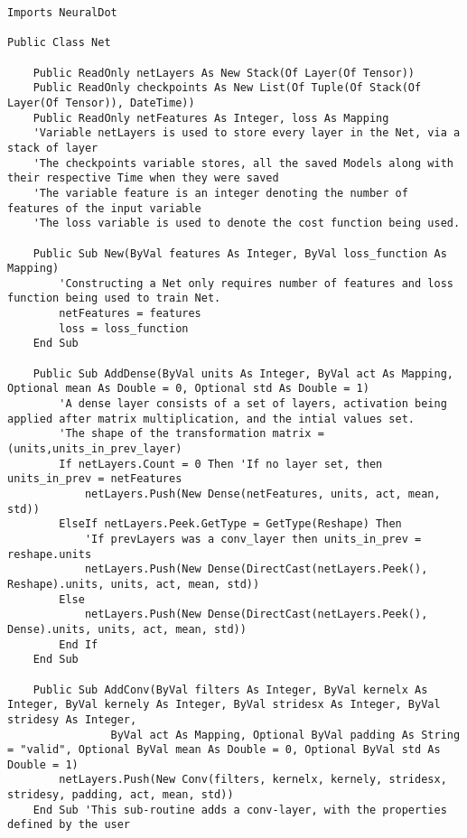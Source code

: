 \begin{verbatim}
Imports NeuralDot

Public Class Net

    Public ReadOnly netLayers As New Stack(Of Layer(Of Tensor))
    Public ReadOnly checkpoints As New List(Of Tuple(Of Stack(Of Layer(Of Tensor)), DateTime))
    Public ReadOnly netFeatures As Integer, loss As Mapping
    'Variable netLayers is used to store every layer in the Net, via a stack of layer
    'The checkpoints variable stores, all the saved Models along with their respective Time when they were saved
    'The variable feature is an integer denoting the number of features of the input variable
    'The loss variable is used to denote the cost function being used.

    Public Sub New(ByVal features As Integer, ByVal loss_function As Mapping)
        'Constructing a Net only requires number of features and loss function being used to train Net.
        netFeatures = features
        loss = loss_function
    End Sub

    Public Sub AddDense(ByVal units As Integer, ByVal act As Mapping, Optional mean As Double = 0, Optional std As Double = 1)
        'A dense layer consists of a set of layers, activation being applied after matrix multiplication, and the intial values set.
        'The shape of the transformation matrix = (units,units_in_prev_layer) 
        If netLayers.Count = 0 Then 'If no layer set, then units_in_prev = netFeatures
            netLayers.Push(New Dense(netFeatures, units, act, mean, std))
        ElseIf netLayers.Peek.GetType = GetType(Reshape) Then
            'If prevLayers was a conv_layer then units_in_prev = reshape.units
            netLayers.Push(New Dense(DirectCast(netLayers.Peek(), Reshape).units, units, act, mean, std))
        Else
            netLayers.Push(New Dense(DirectCast(netLayers.Peek(), Dense).units, units, act, mean, std))
        End If
    End Sub

    Public Sub AddConv(ByVal filters As Integer, ByVal kernelx As Integer, ByVal kernely As Integer, ByVal stridesx As Integer, ByVal stridesy As Integer,
                ByVal act As Mapping, Optional ByVal padding As String = "valid", Optional ByVal mean As Double = 0, Optional ByVal std As Double = 1)
        netLayers.Push(New Conv(filters, kernelx, kernely, stridesx, stridesy, padding, act, mean, std))
    End Sub 'This sub-routine adds a conv-layer, with the properties defined by the user


\end{verbatim}
